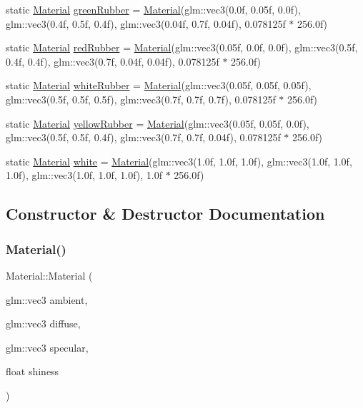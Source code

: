 \begin{DoxyCompactItemize}
\item 
static \mbox{\hyperlink{struct_material}{Material}} \mbox{\hyperlink{struct_material_aab6e7659ecff08471027e084046cafe4}{green\+Rubber}} = \mbox{\hyperlink{struct_material}{Material}}(glm\+::vec3(0.\+0f, 0.\+05f, 0.\+0f), glm\+::vec3(0.\+4f, 0.\+5f, 0.\+4f), glm\+::vec3(0.\+04f, 0.\+7f, 0.\+04f), 0.\+078125f $\ast$ 256.\+0f)
\item 
static \mbox{\hyperlink{struct_material}{Material}} \mbox{\hyperlink{struct_material_a5e1b659445c024a24237731f7d35aa52}{red\+Rubber}} = \mbox{\hyperlink{struct_material}{Material}}(glm\+::vec3(0.\+05f, 0.\+0f, 0.\+0f), glm\+::vec3(0.\+5f, 0.\+4f, 0.\+4f), glm\+::vec3(0.\+7f, 0.\+04f, 0.\+04f), 0.\+078125f $\ast$ 256.\+0f)
\item 
static \mbox{\hyperlink{struct_material}{Material}} \mbox{\hyperlink{struct_material_ab84b745e205896377d3f1fc0e3d1246f}{white\+Rubber}} = \mbox{\hyperlink{struct_material}{Material}}(glm\+::vec3(0.\+05f, 0.\+05f, 0.\+05f), glm\+::vec3(0.\+5f, 0.\+5f, 0.\+5f), glm\+::vec3(0.\+7f, 0.\+7f, 0.\+7f), 0.\+078125f $\ast$ 256.\+0f)
\item 
static \mbox{\hyperlink{struct_material}{Material}} \mbox{\hyperlink{struct_material_acc88ba21b8ed41d61c93d7128b7476fc}{yellow\+Rubber}} = \mbox{\hyperlink{struct_material}{Material}}(glm\+::vec3(0.\+05f, 0.\+05f, 0.\+0f), glm\+::vec3(0.\+5f, 0.\+5f, 0.\+4f), glm\+::vec3(0.\+7f, 0.\+7f, 0.\+04f), 0.\+078125f $\ast$ 256.\+0f)
\item 
static \mbox{\hyperlink{struct_material}{Material}} \mbox{\hyperlink{struct_material_a0bce3d9c7e1e38fbf55e85a0104c2564}{white}} = \mbox{\hyperlink{struct_material}{Material}}(glm\+::vec3(1.\+0f, 1.\+0f, 1.\+0f), glm\+::vec3(1.\+0f, 1.\+0f, 1.\+0f), glm\+::vec3(1.\+0f, 1.\+0f, 1.\+0f), 1.\+0f $\ast$ 256.\+0f)
\end{DoxyCompactItemize}


\subsection{Constructor \& Destructor Documentation}
\mbox{\label{struct_material_a0be7dba7f259e659502c4b543cdd7d8c}} 
\subsubsection{\texorpdfstring{Material()}{Material()}\hspace{0.1cm}{\footnotesize\ttfamily [1/2]}}
{\footnotesize\ttfamily Material\+::\+Material (\begin{DoxyParamCaption}\item[{glm\+::vec3}]{ambient,  }\item[{glm\+::vec3}]{diffuse,  }\item[{glm\+::vec3}]{specular,  }\item[{float}]{shiness }\end{DoxyParamCaption})\hspace{0.3cm}{\ttfamily [inline]}}


